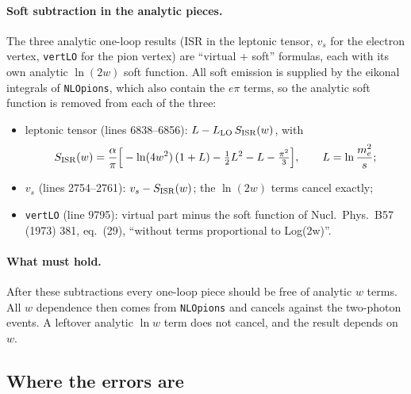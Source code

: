 \documentclass[11pt,a4paper]{article}
\newcommand{\code}[1]{\texttt{#1}}
\begin{document}
\paragraph{Soft subtraction in the analytic pieces.} The three analytic one-loop results (ISR in
the leptonic tensor, $v_s$ for the electron vertex, \code{vertLO} for the pion vertex) are
``virtual + soft'' formulas, each with its own analytic $\ln(2w)$ soft function. All soft
emission is supplied by the eikonal integrals of \code{NLOpions}, which also contain the $e\pi$
terms, so the analytic soft function is removed from each of the three:
\begin{itemize}
\item leptonic tensor (lines 6838--6856): $L-L_{\rm LO}\,S_{\rm ISR}(w)$, with
  \[
  S_{\rm ISR}(w)=\frac{\alpha}{\pi}\Big[-\ln(4w^2)\,(1+L)-\tfrac12L^2-L-\tfrac{\pi^2}{3}\Big],
  \qquad L=\ln\frac{m_e^2}{s};
  \]
\item $v_s$ (lines 2754--2761): $v_s-S_{\rm ISR}(w)$; the $\ln(2w)$ terms cancel exactly;
\item \code{vertLO} (line 9795): virtual part minus the soft function of Nucl.\ Phys.\ B57 (1973)
  381, eq.~(29), ``without terms proportional to Log(2w)''.
\end{itemize}

\paragraph{What must hold.} After these subtractions every one-loop piece should be free of analytic
$w$ terms. All $w$ dependence then comes from \code{NLOpions} and cancels against the
two-photon events. A leftover analytic $\ln w$ term does not cancel, and the result depends on
$w$.

\subsection{Where the errors are}
\label{sec:phok-errors}
\end{document}

